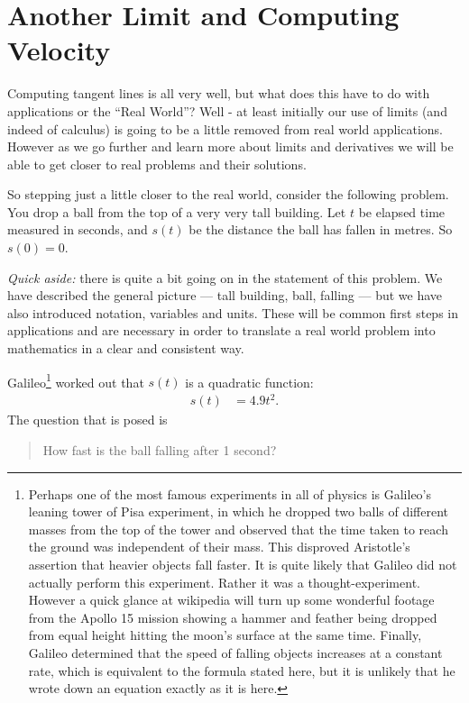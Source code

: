 \section{Another Limit and Computing Velocity} \label{sec velocity}
Computing tangent lines is all very well, but what does this have to do with
applications or the ``Real World''? Well - at least initially our use of limits
(and indeed of calculus) is going to be a little removed from real world
applications. However as we go further and learn more about limits and
derivatives we will be able to get closer to real problems and their solutions.

So stepping just a little closer to the real world, consider the following
problem. You drop a ball from the top of a very very tall building. Let $t$ be
elapsed time measured in seconds, and $s(t)$ be the distance the ball has fallen
in metres. So $s(0) = 0$.

\emph{Quick aside:} there is quite a bit going on in the statement of this
problem. We have described the general picture --- tall building, ball, falling
--- but we have also introduced notation, variables and units. These will be
common first steps in applications and are necessary in order to translate a
real world problem into mathematics in a clear and consistent way.


Galileo\footnote{Perhaps one of the most famous experiments in all of physics
is Galileo's leaning tower of Pisa experiment, in which he dropped two balls
of different masses from the top of the tower and observed that the time
taken to reach the ground was independent of their mass. This
disproved Aristotle's assertion that heavier objects fall faster. It is quite
likely that Galileo did not actually perform this experiment. Rather it was a
thought-experiment. However a quick glance at wikipedia will turn up some
wonderful footage from the Apollo 15 mission showing a hammer and feather being
dropped from equal height hitting the moon's surface at the same time.
Finally, Galileo determined that the speed of falling objects increases at a
constant rate, which is equivalent to the formula stated here, but it is
unlikely that he wrote down an equation exactly as it is here.}
worked out that $s(t)$ is a quadratic function:
\begin{align*}
  s(t) &= 4.9 t^2.
\end{align*}
The question that is posed is
\begin{quote}
 How fast is the ball falling after 1 second?
\end{quote}

